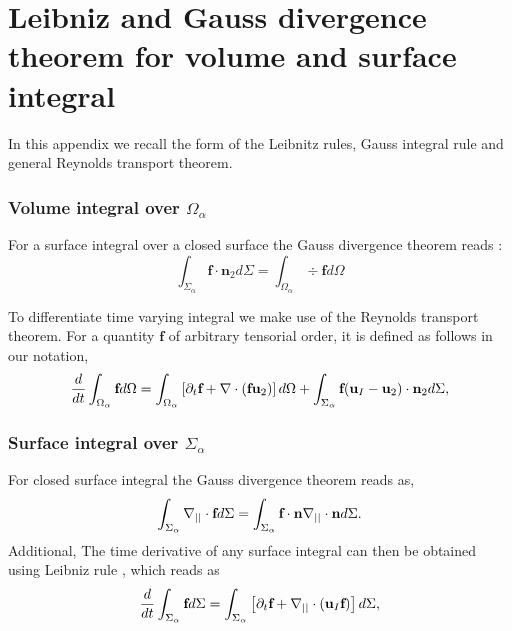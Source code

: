 \section{Leibniz and Gauss divergence theorem for volume and surface integral}
\label{ap:math}

In this appendix we recall the form of the Leibnitz rules, Gauss integral rule and general Reynolds transport theorem. 
\subsubsection*{Volume integral over $\Omega_\alpha$}
For a surface integral over a closed surface the Gauss divergence theorem reads : 
\begin{equation}
    \int_{\Sigma_\alpha} \textbf{f} \cdot \textbf{n}_2 d\Sigma
    = \int_{\Omega_\alpha} \div \textbf{f}d\Omega
\end{equation}

To differentiate time varying integral we make use of the Reynolds transport theorem.
For a quantity $\textbf{f}$ of arbitrary tensorial order, it is defined  as follows in our notation, 
\begin{equation}
    \frac{d}{d t} \int_{\Omega_\alpha} \textbf{f} d\Omega
    = \int_{\Omega_\alpha}\left[\partial_t \textbf{f} + \mathbf{\nabla}\cdot\left(\textbf{f}\textbf{u}_2\right) \right]d\Omega\\
    + \int_{\Sigma_\alpha} \textbf{f} (\textbf{u}_I-\textbf{u}_2)\cdot \textbf{n}_2 d\Sigma,
    \label{eq:Reynolds}
\end{equation}


\subsubsection*{Surface integral over $\Sigma_\alpha$}

For closed surface integral the Gauss divergence theorem reads as, 
\begin{equation}
    \int_{\Sigma_\alpha}  \mathbf{\nabla}_{||}\cdot \textbf{f} d\Sigma
    = 
    \int_{\Sigma_\alpha}  \textbf{f} \cdot \textbf{n}\mathbf{\nabla}_{||}\cdot\textbf{n} d\Sigma. 
    \label{eq:surf_div_theorem}
\end{equation}
Additional, The time derivative of any surface integral can then be obtained using Leibniz rule  \citep{morel2015mathematical}, which reads as  
\begin{equation}
    \frac{d}{d t} \int_{\Sigma_\alpha} \textbf{f} d\Sigma 
    = \int_{\Sigma_\alpha} \left[
        \partial_t \textbf{f} 
        +   \mathbf{\nabla}_{||}\cdot (\textbf{u}_I\textbf{f})
    \right]d\Sigma,
    \label{eq:Leibnitz}
\end{equation}

